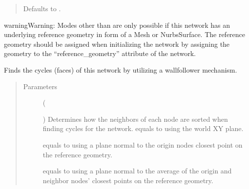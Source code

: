 \documentclass[letterpaper,10pt,english]{sphinxmanual}
\begin{document}
\begin{fulllineitems}
\begin{fulllineitems}
\begin{quote}
\begin{description}
\begin{itemize}
Defaults to .


\end{itemize}

\end{description}\end{quote}

\begin{sphinxadmonition}{warning}{Warning:}
Modes other than  are only possible if this network has an
underlying reference geometry in form of a Mesh or NurbsSurface. The
reference geometry should be assigned when initializing the network by
assigning the geometry to the “reference\_geometry” attribute of the
network.
\end{sphinxadmonition}

\end{fulllineitems}


\begin{fulllineitems}
\label{\detokenize{cockatoo:cockatoo.KnitNetwork.find_cycles}}
Finds the cycles (faces) of this network by utilizing a wall\sphinxhyphen{}follower
mechanism.
\begin{quote}\begin{description}
\item[{Parameters}] \leavevmode
{} (%
\begin{footnote}[129]\sphinxAtStartFootnote
{}
%
\end{footnote}\sphinxstyleliteralemphasis{\sphinxupquote{, }}) \textendash{} 
Determines how the neighbors of each node are sorted when finding
cycles for the network.
 equals to using the world XY plane.

 equals to using a plane normal to the origin nodes closest
point on the reference geometry.

 equals to using a plane normal to the average of the origin
and neighbor nodes’ closest points on the reference geometry.


\end{description}
\end{quote}
\end{fulllineitems}
\end{fulllineitems}
\end{document}
